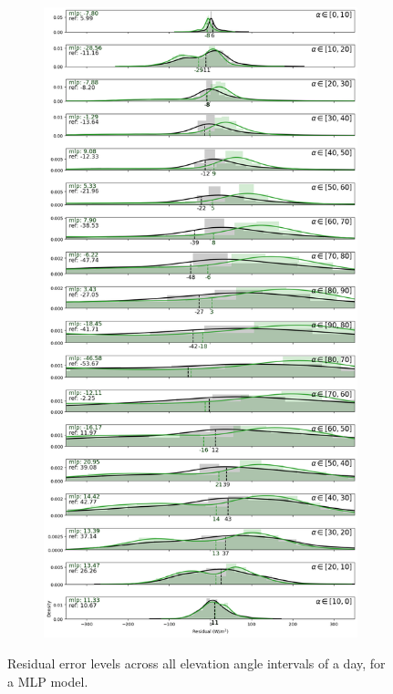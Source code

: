 \begin{figure}[htb!]
\begin{subfigure}{\columnwidth}
    \end{subfigure}
\medskip
    \begin{subfigure}{\columnwidth}
        \includegraphics[width=\columnwidth]{figures/first_study/residual_errors_mlp_site4_rmse.png}
    \end{subfigure}
    \caption[]{Residual error levels across all elevation angle intervals of a day, for a MLP model.}
\end{figure}


